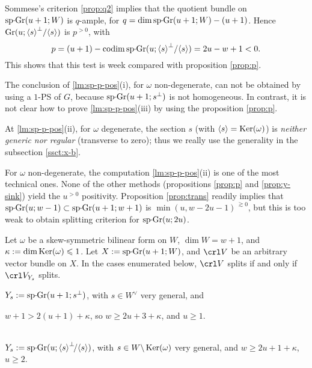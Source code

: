 \documentclass[11pt,reqno]{amsart}
\newenvironment{m-remark}{\vskip5pt\refstepcounter{stff}\trivlist \itemindent 0pt
\item[\hskip\labelsep\bf Remark~\thestff]\ignorespaces}{\endtrivlist\vskip5pt}
\let\nit\noindent
\let\lan\langle
\let\ran\rangle
\numberwithin{equation}{section}
\numberwithin{figure}{section}
\let\sm\setminus
\let\ges\geqslant
\let\les\leqslant
\begin{document}
\begin{m-remark}\label{rmk:sp-bad}
\nit{\rm(i)} 
Sommese's criterion \ref{prop:q2} implies that the quotient bundle on ${{\rm sp{{{\vrule height2.75pt depth-2.35pt width2.3pt \kern1.7pt}}\!}Gr}}(u+1;W)$ 
is $q$-ample, for $q=\dim{{\rm sp{{{\vrule height2.75pt depth-2.35pt width2.3pt \kern1.7pt}}\!}Gr}}(u+1;W)-(u+1)$. 
Hence ${{\rm Gr}}(u;{{\lan {s}\ran}}^\perp/{{\lan {s}\ran}})$ is $p^{{>0}}$, with 
$$
p=(u+1)-{{\rm codim}}\,{{\rm sp{{{\vrule height2.75pt depth-2.35pt width2.3pt \kern1.7pt}}\!}Gr}}(u;{{\lan {s}\ran}}^\perp/{{\lan {s}\ran}})=2u-w+1<0.
$$
This shows that this test is week compared with proposition \ref{prop:p}. 

\nit{\rm(ii)} The conclusion of \ref{lm:sp-p-pos}(i), for $\omega$ non-degenerate, 
can not be obtained by using a $1$-PS of $G$, because ${{\rm sp{{{\vrule height2.75pt depth-2.35pt width2.3pt \kern1.7pt}}\!}Gr}}(u+1;s^\perp)$ is not 
homogeneous. 
In contrast, it is not clear how to prove \ref{lm:sp-p-pos}(iii) by using 
the proposition \ref{prop:p}. 

\nit{\rm(iii)} At \ref{lm:sp-p-pos}(ii), for $\omega$ degenerate, the section $s$ 
(with ${{\lan {s}\ran}}={{\rm Ker}}(\omega)$) is \emph{neither generic nor regular} 
(transverse to zero); thus we really use the generality in the subsection \ref{ssct:x-b}. 

For $\omega$ non-degenerate, the computation \ref{lm:sp-p-pos}(ii) is one 
of the most technical ones. None of the other methods 
(propositions \ref{prop:p} and \ref{prop:y-sink}) yield the $u^{{>0}}$ positivity. 
Proposition \ref{prop:trans} readily implies that 
${{\rm sp{{{\vrule height2.75pt depth-2.35pt width2.3pt \kern1.7pt}}\!}Gr}}(u;w-1)\subset{{\rm sp{{{\vrule height2.75pt depth-2.35pt width2.3pt \kern1.7pt}}\!}Gr}}(u+1;w+1)$ is ${\min(u,w-2u-1)}^{{\,\gtrsim0}}$, 
but this is too weak to obtain splitting criterion for ${{\rm sp{{{\vrule height2.75pt depth-2.35pt width2.3pt \kern1.7pt}}\!}Gr}}(u;2u)$. 
\end{m-remark}

\begin{m-proposition}\label{prop:split-sp}
Let $\omega$ be a skew-symmetric bilinear form on $W$, $\dim W=w+1$, and 
$\kappa:=\dim{{\rm Ker}}(\omega)\les 1$. Let $X:={{\rm sp{{{\vrule height2.75pt depth-2.35pt width2.3pt \kern1.7pt}}\!}Gr}}(u+1;W)$, and $\crl V$ be 
an arbitrary vector bundle on $X$. 
In the cases enumerated below, $\crl V$ splits if and only if $\crl V_{Y_s}$ splits. 

\nit{\rm(i)} $Y_s:={{\rm sp{{{\vrule height2.75pt depth-2.35pt width2.3pt \kern1.7pt}}\!}Gr}}(u+1;s^\perp)$, with $s\in W^\vee$ very general, and  
\\[1ex] \centerline{
$w+1>2(u+1)+\kappa$, so $w\ges 2u+3+\kappa$, and $u\ges1$.
}\\[1ex] 
\nit{\rm(ii)} $Y_s:={{\rm sp{{{\vrule height2.75pt depth-2.35pt width2.3pt \kern1.7pt}}\!}Gr}}(u;{{\lan {s}\ran}}^\perp\!/{{\lan {s}\ran}})$, 
with $s\in W{\sm}\,{{\rm Ker}}(\omega)$ very general, and $w\ges 2u+1+\kappa$, $u\ges 2$.
\end{m-proposition}
\end{document}
